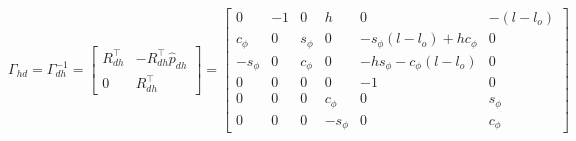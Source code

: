 \documentclass[12pt]{article} %
\numberwithin{equation}{section}  %
\begin{document}
\begin{equation}\label{eq:Ghd}
    \Gamma_{hd} = \Gamma^{-1}_{dh} = \begin{bmatrix}
        R_{dh}^{\top}  &  - R_{dh}^{\top} \widehat{p}_{dh} \\
        0              &  R_{dh}^{\top}
    \end{bmatrix} = \begin{bmatrix}
        0          &  -1  &  0         &  h          &  0                               &  -(l-l_o) \\
        c_{\phi}   &  0   &  s_{\phi}  &  0          &  -s_{\phi}(l-l_o) + h c_{\phi}    &  0 \\
        -s_{\phi}  &  0   &  c_{\phi}  &  0          &  -h s_{\phi} - c_{\phi}(l-l_o)   &  0 \\
        0          &  0   &  0         &  0          &  -1                              &  0         \\
        0          &  0   &  0         &  c_{\phi}   &  0                               &  s_{\phi} \\
        0          &  0   &  0         &  -s_{\phi}  &  0                               &  c_{\phi} 
    \end{bmatrix}
\end{equation}
\end{document}
